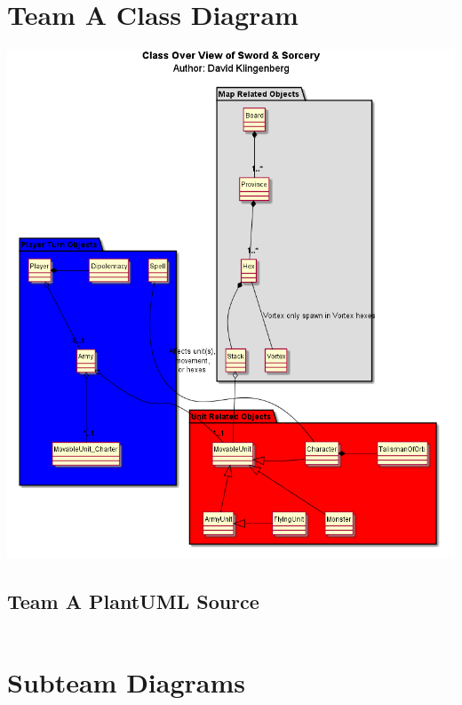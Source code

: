 \documentclass[12pt,a4paper]{article}
\begin{document}
\section{Team A Class Diagram}
\includegraphics[width=\textwidth]{TeamAClassOverView}
\pagebreak
\subsection{Team A PlantUML Source}
\begin{verbatim}

\end{verbatim}

\section{Subteam Diagrams}
\end{document}
